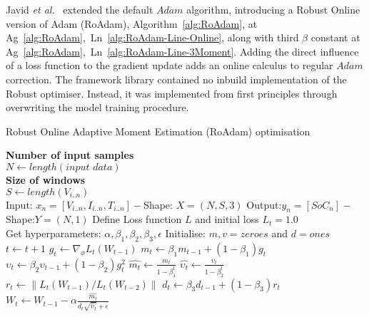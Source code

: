 %
Javid \textit{et al.}~\cite{javid_adaptive_2020} extended the default $Adam$ algorithm, introducing a Robust Online version of Adam (RoAdam), Algorithm~\ref{alg:RoAdam}, at \mbox{Ag~\ref{alg:RoAdam}, Ln~\ref{alg:RoAdam-Line-Online}}, along with third $\beta$ constant at \mbox{Ag~\ref{alg:RoAdam}, Ln~\ref{alg:RoAdam-Line-3Moment}}.
Adding the direct influence of a loss function to the gradient update adds an online calculus to regular $Adam$ correction.
The framework library contained no inbuild implementation of the Robust optimiser.
Instead, it was implemented from first principles through overwriting the model training procedure.
\begin{algorithm}
  \caption{Robust Online Adaptive Moment Estimation (RoAdam) optimisation}
  \begin{algorithmic}[1]
    \STATE \textbf{Number of input samples} \\ $N\gets length(\textit{input data})$\\
    \STATE \textbf{Size of windows} \\ $S\gets length(V_{i..n})$\\
    \STATE Input: $x_n = [V_{i..n}, I_{i..n}, T_{i..n}] - $Shape: $X = (N, S, 3)$
    \STATE Output:$y_n = [SoC_{n}] - $Shape:$Y = (N, 1)$
    \STATE Define Loss function $L$ and initial loss $L_t = 1.0$ \label{alg:RoAdam-Line-Loss}\\
           Get hyperparameters: $\alpha, \beta_1, \beta_2, \beta_3, \epsilon$
    \STATE Initialise: $m,v=zeroes$ and $d=ones$ \label{alg:RoAdam-Line-Vars} \\
    \STATE $t \gets t+1$
    \STATE $g_t \gets \nabla_\phi L_t (W_{t-1})$ 
    \STATE $m_t \gets \beta_1 m_{t-1}+(1-\beta_1) g_t $ 
    \STATE $\upsilon_t \gets \beta_2 \upsilon_{t-1}+ \left(1-\beta_2 \right)g^2_t $ 
    \STATE $\hat{m_t} \gets \frac{m_t}{1-\beta^t_1}$ 
    \STATE $\hat{\upsilon_t} \gets \frac{\upsilon_t}{1-\beta^t_2} $ 
    \STATE $r_t \gets \parallel L_t\left(W_{t-1}\right)/L_t\left(W_{t-2}\right) \parallel $  
    \STATE $d_t \gets \beta_3 d_{t-1}+\left(1-\beta_3\right)r_t $ 
    \STATE $W_t \gets W_{t-1}- \alpha \frac{\hat{m_t}}{d_t\sqrt{\hat{\upsilon_t}}+\epsilon} $ 
    \ENDWHILE
  \end{algorithmic}
  \label{alg:RoAdam}
\end{algorithm}
